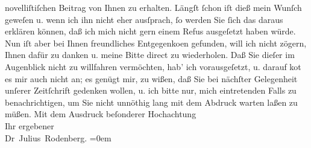 \begin{ledgroupsized}[t]{13cm}
                    novelliſtiſchen Beitrag von Ihnen zu erhalten. Längſt ſchon iſt dieß mein Wunſch
                    geweſen u. wenn ich ihn nicht eher ausſprach, ſo werden Sie ſich das daraus
                    erklären können, daß ich mich nicht gern einem Refus ausgeſetzt haben würde. Nun
                    iſt aber bei Ihnen freundliches Entgegenko{\geminationm}en
                    gefunden, will ich nicht zögern, Ihnen dafür zu danken u. meine Bitte direct zu
                    wiederholen. Daß Sie dieſer im Augenblick nicht zu willfahren vermöchten, hab’
                    ich vorausgeſetzt, u. darauf ko{\geminationm}t es mir auch nicht
                    an; es genügt mir, zu wißen, daß Sie bei nächſter Gelegenheit unſerer
                    Zeitſchrift gedenken wollen, u. {\pb}ich
                    bitte nur, mich eintretenden Falls zu benachrichtigen, um Sie nicht unnöthig
                    lang mit dem Abdruck warten laßen zu müßen.\pend
           \pstart
           Mit dem Ausdruck beſonderer Hochachtung{\\[\baselineskip]}Ihr ergebener{\\[\baselineskip]}\spacefill\mbox{Dr Julius Rodenberg.}\pend
           \leftskip=0em{}\endnumbering{}\end{ledgroupsized}  \newcommand{\dateiname}{L00749}\newcommand{\titel}{Julius Rodenberg an Arthur Schnitzler, 13. 12. 1897}\newcommand{\editorInnen}{Martin Anton Müller und Gerd-Hermann Susen}
      